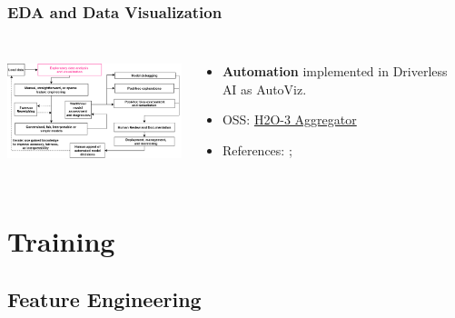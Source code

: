 \documentclass[11pt,
               aspectratio=169,
               hyperref={colorlinks}
               ]{beamer}
\begin{document}
		\begin{frame}
		
			\frametitle{EDA and Data Visualization}		
			
			\begin{columns}
	
				\centering
				\includegraphics[height=100pt]{img/eda.png}
				
				\vspace{-5pt}
				\begin{itemize}
					\item \textbf{Automation} implemented in Driverless AI as AutoViz.
					\item OSS: \href{http://docs.h2o.ai/h2o/latest-stable/h2o-docs/data-science/aggregator.html}{H2O-3 Aggregator}
					\item References: ; 
				\end{itemize}
				
			\end{columns}
		
		\end{frame}

	\section{Training}

		\subsection{Feature Engineering}
\end{document}
